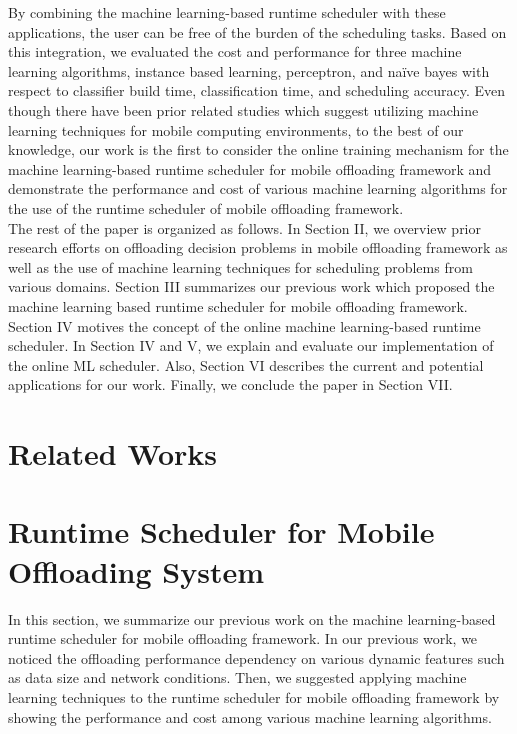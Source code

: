 \documentclass[10pt, conference, compsocconf]{IEEEtran}
\begin{document}
%
By combining the machine learning-based runtime scheduler with these
applications, the user can be free of the burden of the scheduling
tasks.
%
Based on this integration, we evaluated the cost and performance for
three machine learning algorithms, instance based learning, perceptron,
and na\"{i}ve bayes with respect to classifier build time,
classification time, and scheduling accuracy.
%
Even though there have been prior related studies which suggest
utilizing machine learning techniques for mobile computing environments,
to the best of our knowledge, our work is the first to consider the
online training mechanism for the machine learning-based runtime
scheduler for mobile offloading framework and demonstrate the
performance and cost of various machine learning algorithms for the use
of the runtime scheduler of mobile offloading framework.\\   
%
\indent The rest of the paper is organized as follows.
%
In Section II, we overview prior research efforts on offloading decision
problems in mobile offloading framework as well as the use of machine
learning techniques for scheduling problems from various domains.
%
Section III summarizes our previous work which proposed the machine
learning based runtime scheduler for mobile offloading framework.
%
Section IV motives the concept of the online machine learning-based
runtime scheduler.
%
In Section IV and V, we explain and evaluate our implementation of the
online ML scheduler.
%
Also, Section VI describes the current and potential applications for
our work.
%
Finally, we conclude the paper in Section VII.
%
\section{Related Works}
%
\section{Runtime Scheduler for Mobile Offloading System}
%
In this section, we summarize our previous work on the machine
learning-based runtime scheduler for mobile offloading framework.
%
In our previous work, we noticed the offloading performance dependency on
various dynamic features such as data size and network conditions.
%
Then, we suggested applying machine learning techniques to the runtime
scheduler for mobile offloading framework by showing the performance and
cost among various machine learning algorithms. 
% 
\end{document}
